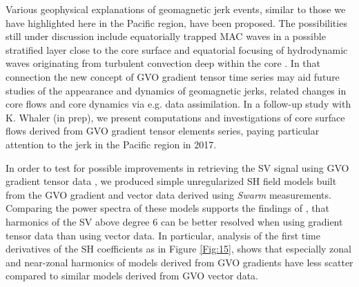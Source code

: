 \documentclass[extra,mreferee]{gji}
\begin{document}
Various geophysical explanations of geomagnetic jerk events, similar to those we have highlighted here in the Pacific region, have been proposed. The possibilities still under discussion include equatorially trapped MAC waves in a possible stratified layer close to the core surface \citep{Buffett_Matsui_2019,ChiDuran_etal_2020} and equatorial focusing of hydrodynamic waves originating from turbulent convection deep within the core \citep{Aubert_Finlay_2019,Gerick_etal_2020}. In that connection the new concept of GVO gradient tensor time series may aid future studies of the appearance and dynamics of geomagnetic jerks, related changes in core flows and core dynamics via e.g. data assimilation. In a follow-up study with K. Whaler (in prep), we present computations and investigations of core surface flows derived from GVO gradient tensor elements series, paying particular attention to the jerk in the Pacific region in 2017. 


In order to test for possible improvements in retrieving the SV signal using GVO gradient tensor data , we produced simple unregularized SH field models built from the GVO gradient and vector data derived using {\it Swarm} measurements. Comparing the power spectra of these models  supports the findings of \cite{kotsiaros_Olsen_2014}, that harmonics of the SV above degree 6 can be better resolved when using gradient tensor data than using vector data. In particular, analysis of the first time derivatives of the SH coefficients as  in Figure \ref{Fig:15}, shows that especially zonal and near-zonal harmonics of models derived from GVO gradients have less scatter compared to similar models derived from GVO vector data. 
\end{document}
